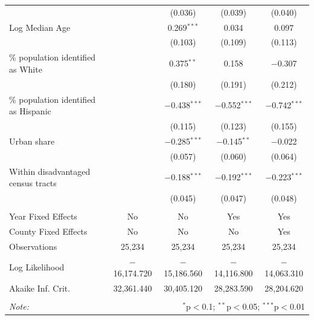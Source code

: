 \documentclass[12pt,twoside,letterpaper]{article}
\begin{document}
\begin{table}[H]
{\begin{tabular}{@{\extracolsep{5pt}}lcccc}
  &  & (0.036) & (0.039) & (0.040) \\ 
  Log Median Age &  & 0.269$^{***}$ & 0.034 & 0.097 \\ 
  &  & (0.103) & (0.109) & (0.113) \\ 
  \% population identified as White &  & 0.375$^{**}$ & 0.158 & $-$0.307 \\ 
  &  & (0.180) & (0.191) & (0.212) \\ 
  \% population identified as Hispanic &  & $-$0.438$^{***}$ & $-$0.552$^{***}$ & $-$0.742$^{***}$ \\ 
  &  & (0.115) & (0.123) & (0.155) \\ 
  Urban share &  & $-$0.285$^{***}$ & $-$0.145$^{**}$ & $-$0.022 \\ 
  &  & (0.057) & (0.060) & (0.064) \\ 
  Within disadvantaged census tracts &  & $-$0.188$^{***}$ & $-$0.192$^{***}$ & $-$0.223$^{***}$ \\ 
  &  & (0.045) & (0.047) & (0.048) \\ 
 \hline \\[-1.8ex] 
Year Fixed Effects & No & No & Yes & Yes \\ 
County Fixed Effects & No & No & No & Yes \\ 
Observations & 25,234 & 25,234 & 25,234 & 25,234 \\ 
Log Likelihood & $-$16,174.720 & $-$15,186.560 & $-$14,116.800 & $-$14,063.310 \\ 
Akaike Inf. Crit. & 32,361.440 & 30,405.120 & 28,283.590 & 28,204.620 \\ 
\hline 
\hline \\[-1.8ex] 
\textit{Note:}  & \multicolumn{4}{r}{$^{*}$p$<$0.1; $^{**}$p$<$0.05; $^{***}$p$<$0.01} \\ 
\end{tabular}  }
\end{table} 
\end{document}
